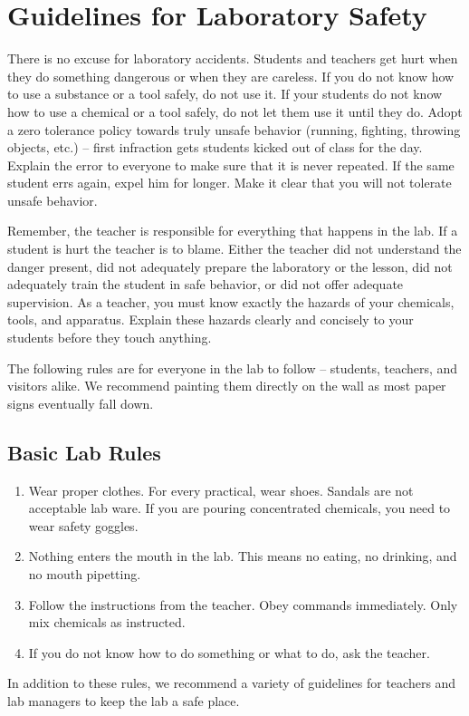 \chapter{Guidelines for Laboratory Safety} 

There is no excuse for laboratory accidents. 
Students and teachers get hurt when they do something dangerous 
or when they are careless. 
If you do not know how to use a substance or a tool safely, do not use it. 
If your students do not know how to use a chemical or a tool safely, 
do not let them use it until they do. 
Adopt a zero tolerance policy towards truly unsafe behavior 
(running, fighting, throwing objects, etc.) -- 
first infraction gets students kicked out of class for the day. 
Explain the error to everyone to make sure that it is never repeated. 
If the same student errs again, expel him for longer. 
Make it clear that you will not tolerate unsafe behavior.

Remember, the teacher is responsible for everything that happens in the lab. 
If a student is hurt the teacher is to blame. 
Either the teacher did not understand the danger present, 
did not adequately prepare the laboratory or the lesson, 
did not adequately train the student in safe behavior, 
or did not offer adequate supervision. 
As a teacher, you must know exactly the hazards of your chemicals, 
tools, and apparatus. 
Explain these hazards clearly and concisely to your students 
before they touch anything.

The following rules are for everyone in the lab to follow -- 
students, teachers, and visitors alike. 
We recommend painting them directly on the wall 
as most paper signs eventually fall down.

\section{Basic Lab Rules} 
\label{sec:basiclabrules}
\begin{enumerate}
\item{Wear proper clothes. For every practical, wear shoes. 
Sandals are not acceptable lab ware. 
If you are pouring concentrated chemicals, you need to wear safety goggles.}
\item{Nothing enters the mouth in the lab. 
This means no eating, no drinking, and no mouth pipetting.}
\item{Follow the instructions from the teacher. 
Obey commands immediately. 
Only mix chemicals as instructed.}
\item{If you do not know how to do something or what to do, ask the teacher.}
\end{enumerate}
In addition to these rules, 
we recommend a variety of guidelines for teachers and lab managers 
to keep the lab a safe place.
\renewcommand{\theenumii}
{\arabic{enumi}.\arabic{enumii}.}
\renewcommand{\labelenumii}{\theenumii}
\renewcommand{\theenumiii}
{\arabic{enumi}.\arabic{enumii}.\arabic{enumiii}.}
\renewcommand{\labelenumiii}{\theenumiii}
\renewcommand{\theenumiv}
{\arabic{enumi}.\arabic{enumii}.\arabic{enumiii}.\arabic{enumiv}.}
\renewcommand{\labelenumiv}{\theenumiv}

